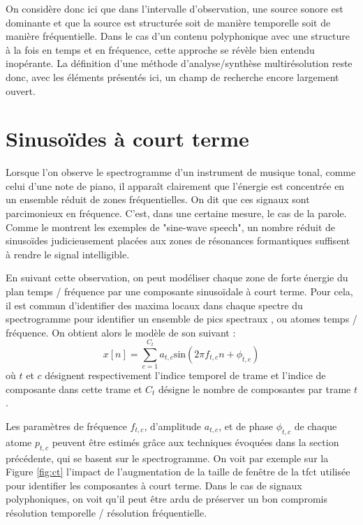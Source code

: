 On considère donc ici que dans l'intervalle d'observation, une source sonore est dominante et que la source est structurée soit de manière temporelle soit de manière fréquentielle. Dans le cas d'un contenu polyphonique avec une structure à la fois en temps et en fréquence, cette approche se révèle bien entendu inopérante. La définition d'une méthode d'analyse/synthèse multirésolution reste donc, avec les éléments présentés ici, un champ de recherche encore largement ouvert.

\section{ \nmu Sinusoïdes à court terme}  \label{sec:sct}

Lorsque l'on observe le spectrogramme d'un instrument de musique tonal, comme celui d'une note de piano, il apparaît clairement que l'énergie est concentrée en un ensemble réduit de zones fréquentielles. On dit que ces signaux sont parcimonieux en fréquence. C'est, dans une certaine mesure, le cas de la parole. Comme le montrent les exemples de "sine-wave speech", un nombre réduit de sinusoïdes judicieusement placées aux zones de résonances formantiques suffisent à rendre le signal intelligible.

En suivant cette observation, on peut modéliser chaque zone de forte énergie du plan temps / fréquence par une composante sinusoïdale à court terme. Pour cela, il est commun d'identifier des maxima locaux dans chaque spectre du spectrogramme pour identifier un ensemble de \og pics spectraux \fg, ou \og atomes \fg temps / fréquence. On obtient alors le modèle de son suivant :
\begin{equation}
  x[n] = \sum_{c=1}^{C_t} a_{t, c} \mathrm{sin}(2 \pi f_{t, c} n + \phi_{t, c})
  \label{eq:sct}
\end{equation}
où $t$ et $c$ désignent respectivement l'indice temporel de trame et l'indice de composante dans cette trame et $C_t$ désigne le nombre de composantes par trame $t$.

Les paramètres de fréquence $f_{t, c}$, d'amplitude $a_{t, c}$, et de phase $\phi_{t, c}$ de chaque atome $p_{t, c}$ peuvent être estimés grâce aux techniques évoquées dans la section précédente, qui se basent sur le spectrogramme. On voit par exemple sur la Figure \ref{fig:ct} l'impact de l'augmentation de la taille de fenêtre de la tfct utilisée pour identifier les composantes à court terme. Dans le cas de signaux polyphoniques, on voit qu'il peut être ardu de préserver un bon compromis résolution temporelle / résolution fréquentielle.

